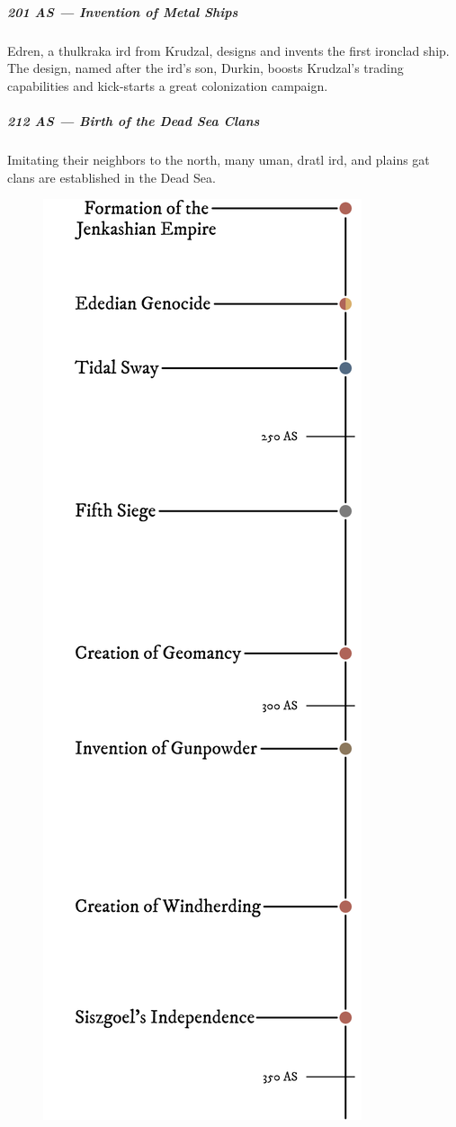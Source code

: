 \subparagraph{201 AS --- Invention of Metal Ships} Edren, a thulkraka ird from Krudzal, designs and invents the first ironclad ship.
The design, named after the ird's son, Durkin, boosts Krudzal's trading capabilities and kick-starts a great colonization campaign.

\subparagraph{212 AS --- Birth of the Dead Sea Clans} Imitating their neighbors to the north, many uman, dratl ird, and plains gat clans are established in the Dead Sea.


\begin{figure}[H]
    \centering \includegraphics{01yuadrem/img/30history_iv.png}
\end{figure}

